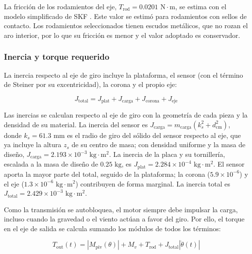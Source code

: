 \documentclass[../../General.tex]{subfiles}
\begin{document}
La fricción de los rodamientos del eje, $T_{\text{rod}} = 0.0201\text{ N}\cdot\text{m}$, se estima con el modelo simplificado de SKF \citep{skf2020bearings}. Este valor se estimó para rodamientos con sellos de contacto. Los rodamientos seleccionados tienen escudos metálicos, que no rozan el aro interior, por lo que su fricción es menor y el valor adoptado es conservador.

\subsubsection{Inercia y torque requerido}

La inercia respecto al eje de giro incluye la plataforma, el sensor (con el término de Steiner por su excentricidad), la corona y el propio eje:

\begin{equation}\label{eq:Jtotal_tilt}
    J_{\text{total}} = J_{\text{plat}} + J_{\text{carga}} + J_{\text{corona}} + J_{\text{eje}}
\end{equation}

Las inercias se calculan respecto al eje de giro con la geometría de cada pieza y la densidad de su material. La inercia del sensor es $J_{\text{carga}} = m_{\text{carga}}\left(k_s^2 + d_{\text{cm}}^2\right)$, donde $k_s = 61.3\text{ mm}$ es el radio de giro del sólido del sensor respecto al eje, que ya incluye la altura $z_s$ de su centro de masa; con densidad uniforme y la masa de diseño, $J_{\text{carga}} = 2.193 \times 10^{-3}\text{ kg}\cdot\text{m}^2$. La inercia de la placa y su tornillería, escalada a la masa de diseño de $0.25\text{ kg}$, es $J_{\text{plat}} = 2.284 \times 10^{-4}\text{ kg}\cdot\text{m}^2$. El sensor aporta la mayor parte del total, seguido de la plataforma; la corona ($5.9 \times 10^{-6}$) y el eje ($1.3 \times 10^{-6}\text{ kg}\cdot\text{m}^2$) contribuyen de forma marginal. La inercia total es $J_{\text{total}} = 2.429 \times 10^{-3}\text{ kg}\cdot\text{m}^2$.

Como la transmisión se autobloquea, el motor siempre debe impulsar la carga, incluso cuando la gravedad o el viento actúan a favor del giro. Por ello, el torque en el eje de salida se calcula sumando los módulos de todos los términos:

\begin{equation}\label{eq:Tout_tilt}
    T_{\text{out}}(t) = \left|M_{\text{piv}}(\theta)\right| + M_v + T_{\text{rod}} + J_{\text{total}} \left|\ddot{\theta}(t)\right|
\end{equation}
\end{document}
